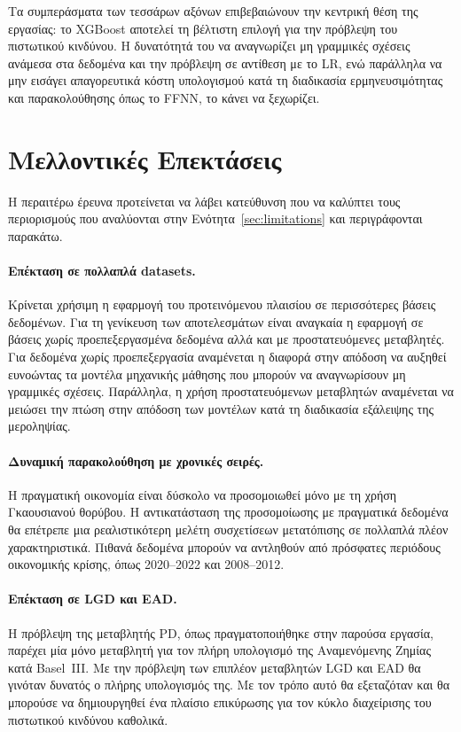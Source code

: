 Τα συμπεράσματα των τεσσάρων αξόνων επιβεβαιώνουν την κεντρική θέση της
εργασίας: το XGBoost αποτελεί τη βέλτιστη επιλογή για την πρόβλεψη του
πιστωτικού κινδύνου. Η δυνατότητά του να αναγνωρίζει μη γραμμικές σχέσεις
ανάμεσα στα δεδομένα και την πρόβλεψη σε αντίθεση με το LR, ενώ παράλληλα
να μην εισάγει απαγορευτικά κόστη υπολογισμού κατά τη διαδικασία
ερμηνευσιμότητας και παρακολούθησης όπως το FFNN, το κάνει να ξεχωρίζει.

\section{Μελλοντικές Επεκτάσεις}
\label{sec:future_work}

Η περαιτέρω έρευνα προτείνεται να λάβει κατεύθυνση που να καλύπτει τους
περιορισμούς που αναλύονται στην Ενότητα~\ref{sec:limitations}
και περιγράφονται παρακάτω.

\paragraph{Επέκταση σε πολλαπλά datasets.}
Κρίνεται χρήσιμη η εφαρμογή του προτεινόμενου πλαισίου σε περισσότερες βάσεις
δεδομένων. Για τη γενίκευση των αποτελεσμάτων είναι αναγκαία η εφαρμογή σε
βάσεις χωρίς προεπεξεργασμένα δεδομένα αλλά και με προστατευόμενες μεταβλητές.
Για δεδομένα χωρίς προεπεξεργασία αναμένεται η διαφορά στην απόδοση να αυξηθεί
ευνοώντας τα μοντέλα μηχανικής μάθησης που μπορούν να αναγνωρίσουν μη γραμμικές
σχέσεις. Παράλληλα, η χρήση προστατευόμενων μεταβλητών αναμένεται να μειώσει
την πτώση στην απόδοση των μοντέλων κατά τη διαδικασία εξάλειψης της μεροληψίας.

\paragraph{Δυναμική παρακολούθηση με χρονικές σειρές.}
Η πραγματική οικονομία είναι δύσκολο να προσομοιωθεί μόνο με τη χρήση
Γκαουσιανού θορύβου. Η αντικατάσταση της προσομοίωσης με πραγματικά δεδομένα
θα επέτρεπε μια ρεαλιστικότερη μελέτη συσχετίσεων μετατόπισης σε πολλαπλά
πλέον χαρακτηριστικά. Πιθανά δεδομένα μπορούν να αντληθούν από πρόσφατες
περιόδους οικονομικής κρίσης, όπως 2020--2022 και 2008--2012.

\paragraph{Επέκταση σε LGD και EAD.}
Η πρόβλεψη της μεταβλητής PD, όπως πραγματοποιήθηκε στην παρούσα εργασία,
παρέχει μία μόνο μεταβλητή για τον πλήρη υπολογισμό της Αναμενόμενης Ζημίας
κατά Basel~III. Με την πρόβλεψη των επιπλέον μεταβλητών LGD και EAD θα
γινόταν δυνατός ο πλήρης υπολογισμός της. Με τον τρόπο αυτό θα εξεταζόταν
και θα μπορούσε να δημιουργηθεί ένα πλαίσιο επικύρωσης για τον κύκλο
διαχείρισης του πιστωτικού κινδύνου καθολικά.

